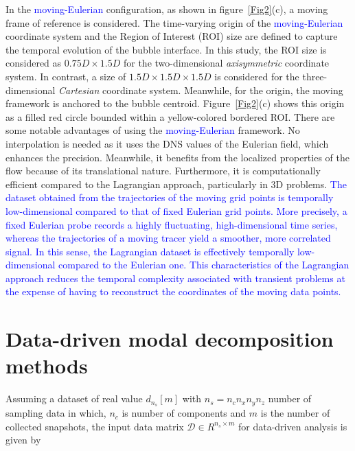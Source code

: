 \documentclass[a4paper,fleqn]{cas-sc}
\newcommand{\hl}[1]{\textcolor{blue}{#1}}
\newcommand{\hl}[1]{#1}
\begin{document}
	In the \hl{moving-Eulerian} configuration, as shown in figure~\ref{Fig2}(c), a moving frame of reference is considered. The time-varying origin of the \hl{moving-Eulerian} coordinate system and the Region of Interest (ROI) size are defined to capture the temporal evolution of the bubble interface. In this study, the ROI size is considered as $0.75D\times 1.5D$ for the two-dimensional \textit{axisymmetric} coordinate system. In contrast, a size of $1.5D\times 1.5D \times 1.5D$ is considered for the three-dimensional \textit{Cartesian} coordinate system. Meanwhile, for the origin, the moving framework is anchored to the bubble centroid. Figure~\ref{Fig2}(c) shows this origin as a filled red circle bounded within a yellow-colored bordered ROI. There are some notable advantages of using the \hl{moving-Eulerian} framework. No interpolation is needed as it uses the DNS values of the Eulerian field, which enhances the precision. Meanwhile, it benefits from the localized properties of the flow because of its translational nature. Furthermore, it is computationally efficient compared to the Lagrangian approach, particularly in 3D problems. \hl{The dataset obtained from the trajectories of the moving grid points is temporally low-dimensional compared to that of fixed Eulerian grid points. More precisely, a fixed Eulerian probe records a highly fluctuating, high-dimensional time series, whereas the trajectories of a moving tracer yield a smoother, more correlated signal. In this sense, the Lagrangian dataset is effectively temporally low-dimensional compared to the Eulerian one. This characteristics of the Lagrangian approach reduces the temporal complexity associated with transient problems at the expense of having to reconstruct the coordinates of the moving data points.}
	
	\section{Data-driven modal decomposition methods}
	\label{Data-driven methods}
	Assuming a dataset of real value $d_{n_s}[m]$ with $n_{s}=n_{c}n_{x}n_{y}n_{z}$ number of sampling data in which, $n_{c}$ is number of components and $m$ is the number of collected snapshots, the input data matrix $\mathcal{D}\in R^{n_{s}\times m}$ for data-driven analysis is given by
	
\end{document}
